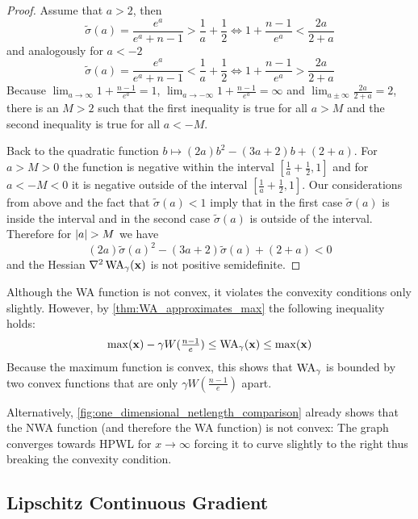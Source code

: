 \begin{proof}
 Assume that \(a > 2\), then
 \[ \tilde{\sigma}(a) = \frac{e^a}{e^a + n-1} > \frac{1}{a} + \frac{1}{2} \iff 1 + \frac{n-1}{e^a} < \frac{2a}{2+a} \]
 and analogously for \(a < -2\)
 \[ \tilde{\sigma}(a) = \frac{e^a}{e^a + n-1} < \frac{1}{a} + \frac{1}{2} \iff 1 + \frac{n-1}{e^a} > \frac{2a}{2+a} \]
 Because \(\lim_{a \to \infty} 1 + \frac{n-1}{e^a} = 1\), \(\lim_{a \to -\infty} 1 + \frac{n-1}{e^a} = \infty\) and \(\lim_{a \pm \infty} \frac{2a}{2+a} = 2\),
 there is an \(M > 2\) such that the first inequality is true for all \(a > M\) and the second inequality is true for all \(a < -M\).
 
 Back to the quadratic function \(b \mapsto (2a)b^2 - (3a + 2)b + (2 + a)\). 
 For \(a > M > 0\) the function is negative within the interval \([\frac{1}{a} + \frac{1}{2}, 1]\)
 and for \(a < -M < 0\) it is negative outside of the interval \([\frac{1}{a} + \frac{1}{2}, 1]\).
 Our considerations from above and the fact that \(\tilde{\sigma}(a) < 1\) imply
 that in the first case \(\tilde{\sigma}(a)\) is inside the interval
 and in the second case \(\tilde{\sigma}(a)\) is outside of the interval.
 Therefore for \(\lvert a\rvert > M\) we have
 \[ (2a) \tilde{\sigma}(a)^2 - (3a + 2)\tilde{\sigma}(a) + (2 + a) < 0 \]
 and the Hessian \(\nabla^2 \operatorname{WA}_\gamma(\mathbf{x})\) is not positive semidefinite.
\end{proof}


\begin{remark}
 Although the WA function is not convex, it violates the convexity conditions only slightly.
 However, by \cref{thm:WA_approximates_max} the following inequality holds:
 \[ \max(\mathbf{x}) - \gamma W(\tfrac{n-1}{e}) \leq \operatorname{WA}_\gamma(\mathbf{x}) \leq \max(\mathbf{x}) \]
 Because the maximum function is convex, this shows that \(\operatorname{WA}_\gamma\) is bounded by two convex functions that are only \(\gamma W(\tfrac{n-1}{e})\) apart.
 
 Alternatively, \cref{fig:one_dimensional_netlength_comparison} already shows that the NWA function (and therefore the WA function) is not convex:
 The graph converges towards HPWL for \(x \to \infty\) forcing it to curve slightly to the right thus breaking the convexity condition.
\end{remark}



\subsection{Lipschitz Continuous Gradient} \label{sec:WA_Lipschitz_continuous_gradient}

